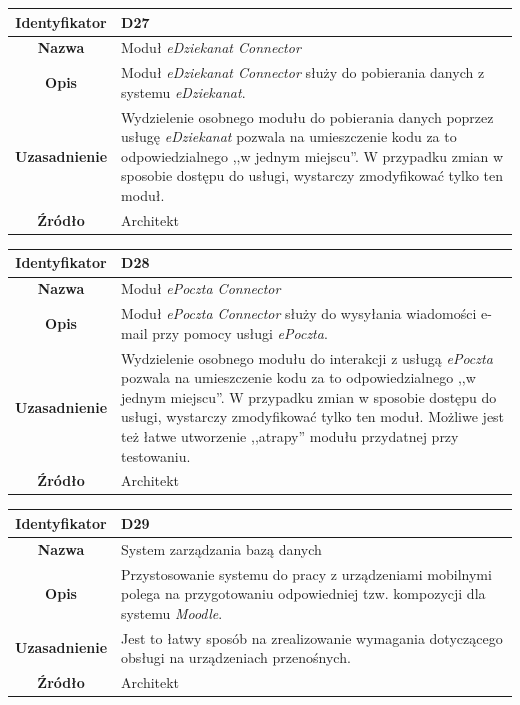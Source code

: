 \begin{table}[H]
\centering
\begin{tabular}{ | >{\bfseries}c | p{11cm} | }
\hline
%
Identyfikator & D27 \\ \hline
Nazwa & Moduł \textit{eDziekanat Connector} \\ \hline
Opis & Moduł \textit{eDziekanat Connector} służy do pobierania danych z systemu \textit{eDziekanat}. \\ \hline
Uzasadnienie & Wydzielenie osobnego modułu do pobierania danych poprzez usługę \textit{eDziekanat} pozwala na umieszczenie kodu za to odpowiedzialnego ,,w jednym miejscu''. W przypadku zmian w sposobie dostępu do usługi, wystarczy zmodyfikować tylko ten moduł. \\ \hline
Źródło & Architekt \\ \hline
%
\end{tabular}
\end{table}

\begin{table}[H]
\centering
\begin{tabular}{ | >{\bfseries}c | p{11cm} | }
\hline
%
Identyfikator & D28 \\ \hline
Nazwa & Moduł \textit{ePoczta Connector} \\ \hline
Opis & Moduł \textit{ePoczta Connector} służy do wysyłania wiadomości e-mail przy pomocy usługi \textit{ePoczta}. \\ \hline
Uzasadnienie & Wydzielenie osobnego modułu do interakcji z usługą \textit{ePoczta} pozwala na umieszczenie kodu za to odpowiedzialnego ,,w jednym miejscu''. W przypadku zmian w sposobie dostępu do usługi, wystarczy zmodyfikować tylko ten moduł. Możliwe jest też łatwe utworzenie ,,atrapy'' modułu przydatnej przy testowaniu. \\ \hline
Źródło & Architekt \\ \hline
%
\end{tabular}
\end{table}

\begin{table}[H]
\centering
\begin{tabular}{ | >{\bfseries}c | p{11cm} | }
\hline
%
Identyfikator & D29 \\ \hline
Nazwa & System zarządzania bazą danych \\ \hline
Opis & Przystosowanie systemu do pracy z urządzeniami mobilnymi polega na przygotowaniu odpowiedniej tzw. kompozycji dla systemu \textit{Moodle}. \\ \hline
Uzasadnienie & Jest to łatwy sposób na zrealizowanie wymagania dotyczącego obsługi na urządzeniach przenośnych. \\ \hline
Źródło & Architekt \\ \hline
%
\end{tabular}
\end{table}

